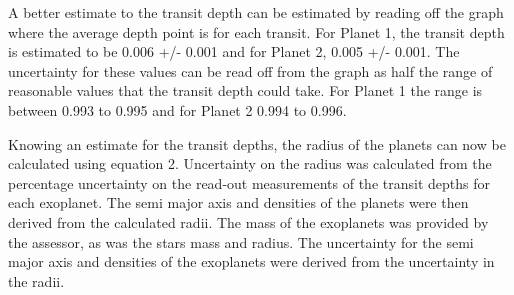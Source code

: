 \documentclass[11pt]{article}
\begin{document}
A better estimate to the transit depth can be estimated by reading off
the graph where the average depth point is for each transit. For Planet
1, the transit depth is estimated to be 0.006 +/- 0.001 and for Planet
2, 0.005 +/- 0.001. The uncertainty for these values can be read off
from the graph as half the range of reasonable values that the transit
depth could take. For Planet 1 the range is between 0.993 to 0.995 and
for Planet 2 0.994 to 0.996.

Knowing an estimate for the transit depths, the radius of the planets
can now be calculated using equation 2. Uncertainty on the radius was
calculated from the percentage uncertainty on the read-out measurements
of the transit depths for each exoplanet. The semi major axis and
densities of the planets were then derived from the calculated radii.
The mass of the exoplanets was provided by the assessor, as was the
stars mass and radius. The uncertainty for the semi major axis and
densities of the exoplanets were derived from the uncertainty in the
radii.
\end{document}

